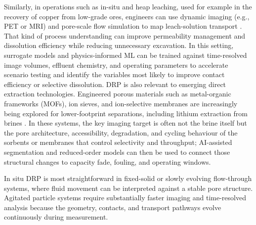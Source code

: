 \documentclass[12pt,a4paper]{article}
\begin{document}
Similarly, in operations such as in-situ and heap leaching, used for example in the recovery of copper from low-grade ores, engineers can use dynamic imaging (e.g., PET or MRI) and pore-scale flow simulation to map leach-solution transport \cite{mri_heap_leach_2015}. That kind of process understanding can improve permeability management and dissolution efficiency while reducing unnecessary excavation. In this setting, surrogate models and physics-informed ML can be trained against time-resolved image volumes, effluent chemistry, and operating parameters to accelerate scenario testing and identify the variables most likely to improve contact efficiency or selective dissolution. DRP is also relevant to emerging direct extraction technologies. Engineered porous materials such as metal-organic frameworks (MOFs), ion sieves, and ion-selective membranes are increasingly being explored for lower-footprint separations, including lithium extraction from brines \cite{mofs_lithium_2026, mojid_dle_2024, baird_dle_2024}. In these systems, the key imaging target is often not the brine itself but the pore architecture, accessibility, degradation, and cycling behaviour of the sorbents or membranes that control selectivity and throughput; AI-assisted segmentation and reduced-order models can then be used to connect those structural changes to capacity fade, fouling, and operating windows.

In situ DRP is most straightforward in fixed-solid or slowly evolving flow-through systems, where fluid movement can be interpreted against a stable pore structure. Agitated particle systems require substantially faster imaging and time-resolved analysis because the geometry, contacts, and transport pathways evolve continuously during measurement.
\end{document}
